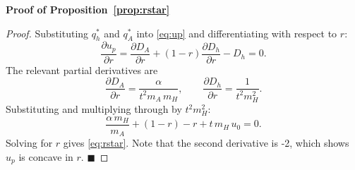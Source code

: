 \documentclass[mnsc,nonblindrev]{informs3_NoOR}
\begin{document}
\noindent\textbf{Proof of Proposition~\ref{prop:rstar}}
\label{app:proof_rstar}
\begin{proof}
Substituting $q_h^*$ and $q_A^*$ into \eqref{eq:up} and differentiating with respect to $r$:
\begin{equation}
    \frac{\partial u_p}{\partial r} = \frac{\partial D_A}{\partial r} + (1-r)\frac{\partial D_h}{\partial r} - D_h = 0.
\end{equation}
The relevant partial derivatives are
\begin{equation}
    \frac{\partial D_A}{\partial r} = \frac{\alpha}{t^2 m_A\,m_H}, \qquad
    \frac{\partial D_h}{\partial r} = \frac{1}{t^2 m_H^2}.
\end{equation}
Substituting and multiplying through by $t^2 m_H^2$:
\[
    \frac{\alpha\,m_H}{m_A} + (1-r) - r + t\,m_H\,u_0 = 0.
\]
Solving for $r$ gives \eqref{eq:rstar}. Note that the second derivative is -2, which shows $u_p$ is concave in $r$.
\hfill$\blacksquare$
\end{proof}
\end{document}
